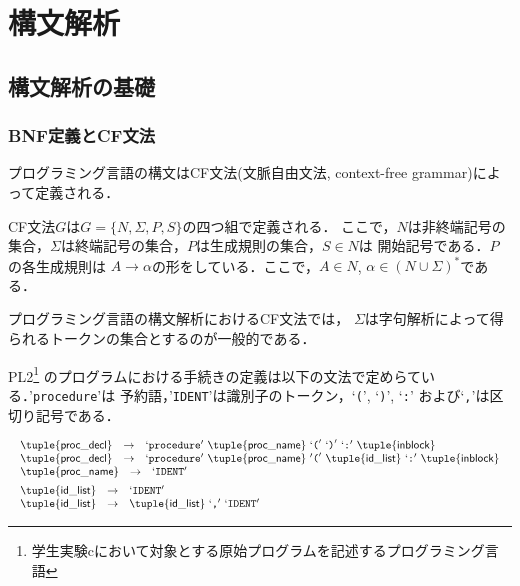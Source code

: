 \documentclass[dvipdfmx,a4j]{jbook}
\begin{document}
\chapter{構文解析}
\section{構文解析の基礎}
\subsection{BNF定義とCF文法}

プログラミング言語の構文はCF文法(文脈自由文法, context-free grammar)によって定義される．

\begin{Def}
CF文法$G$は$G=\{N,\Sigma,P,S\}$の四つ組で定義される．
ここで，$N$は非終端記号の集合，$\Sigma$は終端記号の集合，$P$は生成規則の集合，$S\in N$は
開始記号である．$P$の各生成規則は $A\rightarrow\alpha$の形をしている．ここで，$A\in N$,
$\alpha\in (N\cup\Sigma)^\ast$である．
\end{Def}

プログラミング言語の構文解析におけるCF文法では，
$\Sigma$は字句解析によって得られるトークンの集合とするのが一般的である．

PL2\footnote{学生実験cにおいて対象とする原始プログラムを記述するプログラミング言語}
のプログラムにおける手続きの定義は以下の文法で定めらている．'\texttt{procedure}'は
予約語，'\texttt{IDENT}'は識別子のトークン，`\texttt{(}', `\texttt{)}', `\texttt{:}'
および`\texttt{,}'は区切り記号である．

\[\begin{array}{l}
\begin{array}{rcl}
  \tuple{\mathsf{proc\_decl}} & \rightarrow & `\texttt{procedure}'\ \tuple{\mathsf{proc\_name}}\ `\texttt{(}'\ `\texttt{)}'\ `\texttt{:}'\ \tuple{\mathsf{inblock}}\\
  \tuple{\mathsf{proc\_decl}} & \rightarrow & `\texttt{procedure}'\ \tuple{\mathsf{proc\_name}}\ '\texttt{(}'\ \tuple{\mathsf{id\_list}}\ `\texttt{:}'\ \tuple{\mathsf{inblock}}\\ 
\end{array}\\[5pt]
\begin{array}{rcl}
  \tuple{\mathsf{proc\_name}} & \rightarrow & `\texttt{IDENT}'
\end{array}\\[5pt]
\begin{array}{rcl}
  \tuple{\mathsf{id\_list}} & \rightarrow & `\texttt{IDENT}'\\
  \tuple{\mathsf{id\_list}} & \rightarrow & \tuple{\mathsf{id\_list}}\ `\texttt{,}'\ `\texttt{IDENT}'
\end{array}
\end{array}\]
\end{document}
